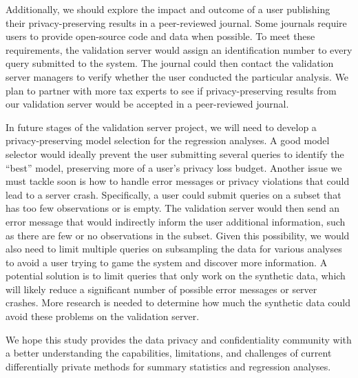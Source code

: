 Additionally, we should explore the impact and outcome of a user publishing their privacy-preserving results in a peer-reviewed journal. Some journals require users to provide open-source code and data when possible. To meet these requirements, the validation server would assign an identification number to every query submitted to the system. The journal could then contact the validation server managers to verify whether the user conducted the particular analysis. We plan to partner with more tax experts to see if privacy-preserving results from our validation server would be accepted in a peer-reviewed journal.

In future stages of the validation server project, we will need to develop a privacy-preserving model selection for the regression analyses. A good model selector would ideally prevent the user submitting several queries to identify the ``best'' model, preserving more of a user's privacy loss budget. Another issue we must tackle soon is how to handle error messages or privacy violations that could lead to a server crash. Specifically, a user could submit queries on a subset that has too few observations or is empty. The validation server would then send an error message that would indirectly inform the user additional information, such as there are few or no observations in the subset. Given this possibility, we would also need to limit multiple queries on subsampling the data for various analyses to avoid a user trying to game the system and discover more information. A potential solution is to limit queries that only work on the synthetic data, which will likely reduce a significant number of possible error messages or server crashes. More research is needed to determine how much the synthetic data could avoid these problems on the validation server.

We hope this study provides the data privacy and confidentiality community with a better understanding the capabilities, limitations, and challenges of current differentially private methods for summary statistics and regression analyses. 